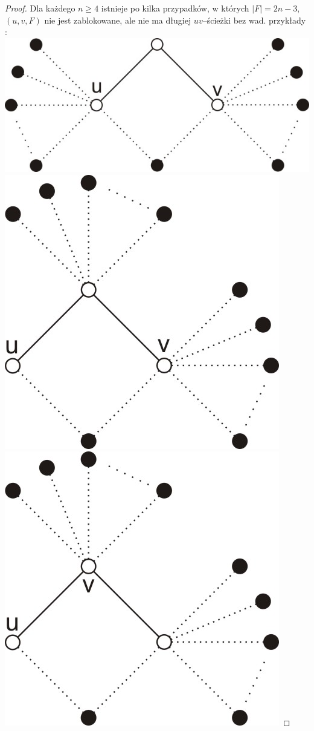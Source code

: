 \documentclass{pracamgr}
\begin{document}
   \begin{proof}
   Dla każdego $n\ge 4$ istnieje po kilka przypadków, w których $|F|=2n-3$, $(u,v,F)$ nie jest zablokowane, ale nie ma długiej $uv$--ścieżki bez wad. przykłady :\newline
   \includegraphics{img/Q_niezablokowane_1.jpg}\quad\quad\quad
   \includegraphics{img/Q_niezablokowane_2.jpg}\quad\quad\quad
   \includegraphics{img/Q_niezablokowane_3.jpg}
   \end{proof}
   \vspace*{30pt}
\end{document}
